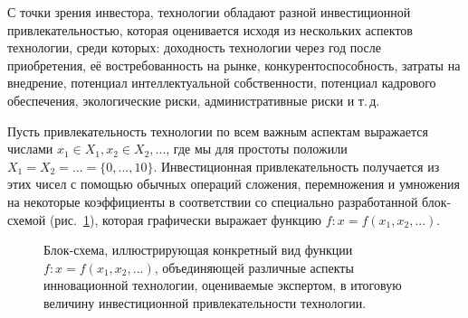 
С точки зрения инвестора, технологии обладают разной инвестиционной привлекательностью, которая оценивается исходя из нескольких аспектов технологии, среди которых: доходность технологии через год после приобретения, её востребованность на рынке, конкурентоспособность, затраты на внедрение, потенциал интеллектуальной собственности, потенциал кадрового обеспечения, экологические риски, административные риски и т.\,д. 

Пусть привлекательность технологии по всем важным аспектам выражается числами $x_1 \in X_1, x_2 \in X_2, ...$, где мы для простоты положили $X_1 = X_2 = ... = \{0, ..., 10\}$. Инвестиционная привлекательность получается из этих чисел с помощью обычных операций сложения, перемножения и умножения на некоторые коэффициенты в соответствии со специально разработанной блок-схемой (рис.~\ref{ris:tech_scheme}), которая графически выражает функцию $f: x = f(x_1, x_2, ...)$. 

\begin{figure}[h]
\caption{\small Блок-схема, иллюстрирующая конкретный вид функции $f: x = f(x_1, x_2, ...)$, объединяющей различные аспекты инновационной технологии, оцениваемые экспертом, в итоговую величину инвестиционной привлекательности технологии. }
\label{ris:tech_scheme}
\end{figure}

